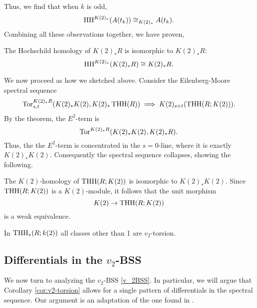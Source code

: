 Thus, we find that when $k$ is odd, 
\[
\operatorname{HH}^{K(2)_*}(A(t_k))\cong_{K(2)_*}A(t_k).
\]
Combining all these observations together, we have proven,
\begin{thm}\label{thm: HH of K(2)R}
	The Hochschild homology of $K(2)_*R$ is isomorphic to $K(2)_*R$:
	\[
	\operatorname{HH}^{K(2)_*}(K(2)_*R)\cong K(2)_*R.
	\]
\end{thm}
We now proceed as how we sketched above. Consider the Eilenberg-Moore spectral sequence 
\[
\operatorname{Tor}^{K(2)_*R}_{s,t}(K(2)_*K(2), K(2)_*\operatorname{THH}(R))\implies K(2)_{s+t}(\operatorname{THH}(R;K(2))).
\]
By the theorem, the $E^2$-term is 
\[
\operatorname{Tor}^{K(2)_*R}(K(2)_*K(2), K(2)_*R).
\]
Thus, the the $E^2$-term is concentrated in the $s=0$-line, where it is exactly $K(2)_*K(2)$. Consequently the spectral sequence collapses, showing the following.
\begin{cor}\label{cor:THH with K(2) coeff}
	The $K(2)$-homology of $\operatorname{THH}(R;K(2))$ is isomorphic to $K(2)_*K(2)$. Since $\operatorname{THH}(R;K(2))$ is a $K(2)$-module, it follows that the unit morphism
	\[
	K(2)\to \operatorname{THH}(R;K(2))
	\]
	is a weak equivalence.
\end{cor}

\begin{cor}\label{cor:v2-torsion}
	In $\operatorname{THH}_*(R;k(2))$ all classes other than 1 are $v_2$-torsion.
\end{cor}

\subsection{Differentials in the $v_2$-BSS}
We now turn to analyzing the $v_2$-BSS \eqref{v_2BSS}. In particular, we will argue that Corollary \ref{cor:v2-torsion} allows for a single pattern of differentials in the spectral sequence. Our argument is an adaptation of the one found in \cite{McClureStaffeldt}.

